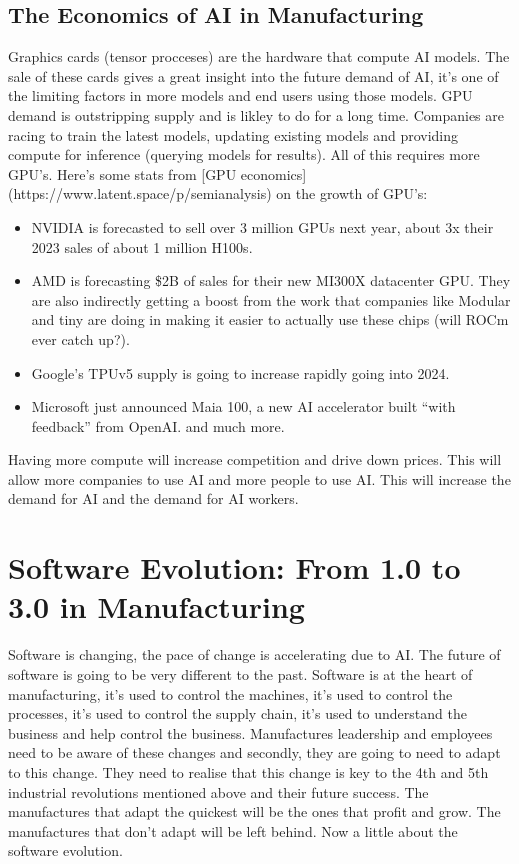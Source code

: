 \documentclass[
  letterpaper,
  DIV=11,
  numbers=noendperiod]{scrartcl}
\providecommand{\tightlist}{%
  \setlength{\itemsep}{0pt}\setlength{\parskip}{0pt}}\usepackage{longtable,booktabs,array}
\begin{document}
\hypertarget{the-economics-of-ai-in-manufacturing}{%
\subsection{The Economics of AI in
Manufacturing}\label{the-economics-of-ai-in-manufacturing}}

Graphics cards (tensor procceses) are the hardware that compute AI
models. The sale of these cards gives a great insight into the future
demand of AI, it's one of the limiting factors in more models and end
users using those models. GPU demand is outstripping supply and is
likley to do for a long time. Companies are racing to train the latest
models, updating existing models and providing compute for inference
(querying models for results). All of this requires more GPU's. Here's
some stats from {[}GPU economics{]}
(https://www.latent.space/p/semianalysis) on the growth of GPU's:

\begin{itemize}
\tightlist
\item
  NVIDIA is forecasted to sell over 3 million GPUs next year, about 3x
  their 2023 sales of about 1 million H100s.
\item
  AMD is forecasting \$2B of sales for their new MI300X datacenter GPU.
  They are also indirectly getting a boost from the work that companies
  like Modular and tiny are doing in making it easier to actually use
  these chips (will ROCm ever catch up?).
\item
  Google's TPUv5 supply is going to increase rapidly going into 2024.
\item
  Microsoft just announced Maia 100, a new AI accelerator built ``with
  feedback'' from OpenAI. and much more.
\end{itemize}

Having more compute will increase competition and drive down prices.
This will allow more companies to use AI and more people to use AI. This
will increase the demand for AI and the demand for AI workers.

\hypertarget{software-evolution-from-1.0-to-3.0-in-manufacturing}{%
\section{Software Evolution: From 1.0 to 3.0 in
Manufacturing}\label{software-evolution-from-1.0-to-3.0-in-manufacturing}}

Software is changing, the pace of change is accelerating due to AI. The
future of software is going to be very different to the past. Software
is at the heart of manufacturing, it's used to control the machines,
it's used to control the processes, it's used to control the supply
chain, it's used to understand the business and help control the
business. Manufactures leadership and employees need to be aware of
these changes and secondly, they are going to need to adapt to this
change. They need to realise that this change is key to the 4th and 5th
industrial revolutions mentioned above and their future success. The
manufactures that adapt the quickest will be the ones that profit and
grow. The manufactures that don't adapt will be left behind. Now a
little about the software evolution.
\end{document}
